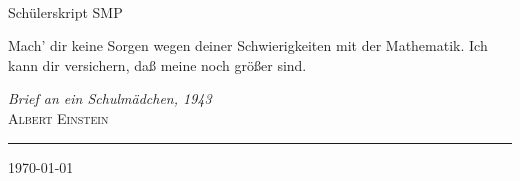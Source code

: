 \begin{titlepage}
	\begin{center}
		\hfill  \\
		[3,5cm]

		\titlefont Schülerskript SMP\\
		[0,5cm]
	\end{center}
	\epigraph{Mach' dir keine Sorgen wegen deiner Schwierigkeiten mit der Mathematik. Ich kann dir versichern, daß meine noch größer sind.}
	{\textit{Brief an ein Schulmädchen, 1943}\\ \textsc{Albert Einstein}}
	\null\vfill
	\vspace*{1cm}
	\noindent
	\hfill
	\begin{minipage}{0.35\linewidth}
	    \begin{flushright}
	        \printauthor
	    \end{flushright}
	\end{minipage}
	\begin{minipage}{0.02\linewidth}
	    \rule{1pt}{100pt}
	\end{minipage}
	\titlepagedecoration
	\begin{center}
		\small{\today} \\
	\end{center}
\end{titlepage}
